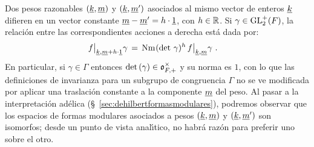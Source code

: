 \begin{obsEleccionDelFactor}
	Dos pesos razonables $(\underline{k},\underline{m})$ y $(\underline{k},\underline{m}')$
	asociados al mismo vector de enteros $\underline{k}$ difieren en un vector
	constante $\underline{m}-\underline{m}'=h\cdot\underline{1}$, con $h\in\mathbb{R}$. Si
	$\gamma\in\mathrm{GL}^{+}_{2}(F)$, la relaci\'{o}n entre las correspondientes
	acciones a derecha est\'{a} dada por:
	\begin{align*}
		f\big|_{\underline{k},\underline{m}+h\cdot\underline{1}}{\gamma}
			& \,=\,\mathrm{Nm}_{}(\mathrm{det}\,\,\gamma)^h\,
				f\big|_{\underline{k},\underline{m}}{\gamma}
		\text{ .}
	\end{align*}
	En particular, si $\gamma\in\Gamma$ entonces
	$\mathrm{det}\,(\gamma)\in\mathfrak{o}_{F,+}^{\times}$ y su norma es $1$, con lo que las
	definiciones de invarianza para un subgrupo de congruencia $\Gamma$ no
	se ve modificada por aplicar una traslaci\'{o}n constante a la
	componente $\underline{m}$ del peso.
	Al pasar a la interpretaci\'{o}n
	ad\'{e}lica (\S~\ref{sec:dehilbertformasmodulares}), podremos observar
	que los espacios de formas modulares asociados a pesos
	$(\underline{k},\underline{m})$ y $(\underline{k},\underline{m}')$ son isomorfos; desde un
	punto de vista anal\'{\i}tico, no habr\'{a} raz\'{o}n para preferir uno
	sobre el otro.


\end{obsEleccionDelFactor}
